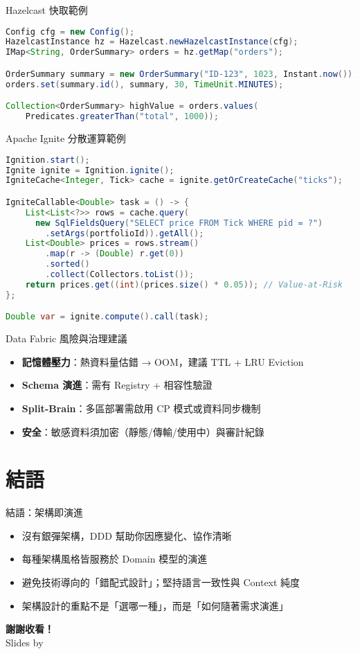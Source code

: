 \documentclass[UTF8]{beamer}
\begin{document}
\begin{frame}[fragile]{Hazelcast 快取範例}
    \begin{lstlisting}[language=Java]
Config cfg = new Config();
HazelcastInstance hz = Hazelcast.newHazelcastInstance(cfg);
IMap<String, OrderSummary> orders = hz.getMap("orders");

OrderSummary summary = new OrderSummary("ID-123", 1023, Instant.now());
orders.set(summary.id(), summary, 30, TimeUnit.MINUTES);

Collection<OrderSummary> highValue = orders.values(
    Predicates.greaterThan("total", 1000));
\end{lstlisting}
\end{frame}

\begin{frame}[fragile]{Apache Ignite 分散運算範例}
    \begin{lstlisting}[language=Java]
Ignition.start();
Ignite ignite = Ignition.ignite();
IgniteCache<Integer, Tick> cache = ignite.getOrCreateCache("ticks");

IgniteCallable<Double> task = () -> {
    List<List<?>> rows = cache.query(
      new SqlFieldsQuery("SELECT price FROM Tick WHERE pid = ?")
        .setArgs(portfolioId)).getAll();
    List<Double> prices = rows.stream()
        .map(r -> (Double) r.get(0))
        .sorted()
        .collect(Collectors.toList());
    return prices.get((int)(prices.size() * 0.05)); // Value-at-Risk
};

Double var = ignite.compute().call(task);
\end{lstlisting}
\end{frame}

\begin{frame}{Data Fabric 風險與治理建議}
    \begin{itemize}
        \item \textbf{記憶體壓力}：熱資料量估錯 → OOM，建議 TTL + LRU Eviction
        \item \textbf{Schema 演進}：需有 Registry + 相容性驗證
        \item \textbf{Split-Brain}：多區部署需啟用 CP 模式或資料同步機制
        \item \textbf{安全}：敏感資料須加密（靜態/傳輸/使用中）與審計紀錄
    \end{itemize}
\end{frame}

\section{結語}
\begin{frame}{結語：架構即演進}
    \begin{itemize}
        \item 沒有銀彈架構，DDD 幫助你因應變化、協作清晰
        \item 每種架構風格皆服務於 Domain 模型的演進
        \item 避免技術導向的「錯配式設計」；堅持語言一致性與 Context 純度
        \item 架構設計的重點不是「選哪一種」，而是「如何隨著需求演進」
    \end{itemize}
\end{frame}

\begin{frame}
    \centering
    \Huge \textbf{謝謝收看！} \\
    \vspace{1cm}
    \normalsize Slides by
\end{frame}
\end{document}
